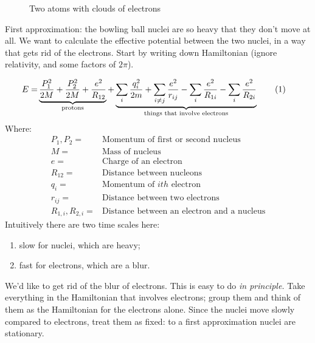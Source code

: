 \documentclass[]{article}
\newcommand\numberthis{\addtocounter{equation}{1}\tag{\theequation}}
\begin{document}
\begin{figure}[H]
	\begin{center}
		\caption{Two atoms with clouds of electrons}\label{fig:3-2-atoms}
	\end{center}
\end{figure}

First approximation: the bowling ball nuclei  are so heavy that they don't move at all. We want to calculate the effective potential between the two nuclei, in a way that gets rid of the electrons. Start by writing down Hamiltonian (ignore relativity, and some factors of $2\pi$).

\begin{align*}
	E=& \underbrace{\frac{P_1^2}{2M} + \frac{P_2^2}{2M} + \frac{e^2}{R_{12}}}_\text{protons} + \underbrace{\sum_i \frac{q_i^2}{2m} + \sum_{i\ne j}\frac{e^2}{r_{ij}}- \sum_i \frac{e^2}{R_{1i}} - \sum_i \frac{e^2}{R_{2i}}}_\text{things that involve electrons} \numberthis \label{eq:hamiltonian:H2}
\end{align*}
Where:
\begin{align*}
	P_1,P_2 =& \text{Momentum of first or second nucleus}\\
	M =& \text{Mass of  nucleus}\\
	e=& \text{Charge of an electron}\\
	R_{12}=& \text{Distance between nucleons}\\
	q_i=& \text{Momentum of $ith$ electron}\\
	r_{ij}=& \text{Distance between two electrons}\\
	R_{1,i},R_{2,i}=& \text{Distance between an electron and a nucleus}
\end{align*}
Intuitively there are two time scales here:
\begin{enumerate}
	\item slow for nuclei, which are heavy;
	\item fast for electrons, which are a blur.
\end{enumerate}

We'd like to get rid of the blur of electrons. This is easy to do \emph{in principle.} Take everything in the Hamiltonian that involves electrons; group them and think of them as the Hamiltonian for the electrons alone. Since the nuclei move slowly compared to electrons, treat them as fixed: to a first approximation nuclei are stationary.
\end{document}

